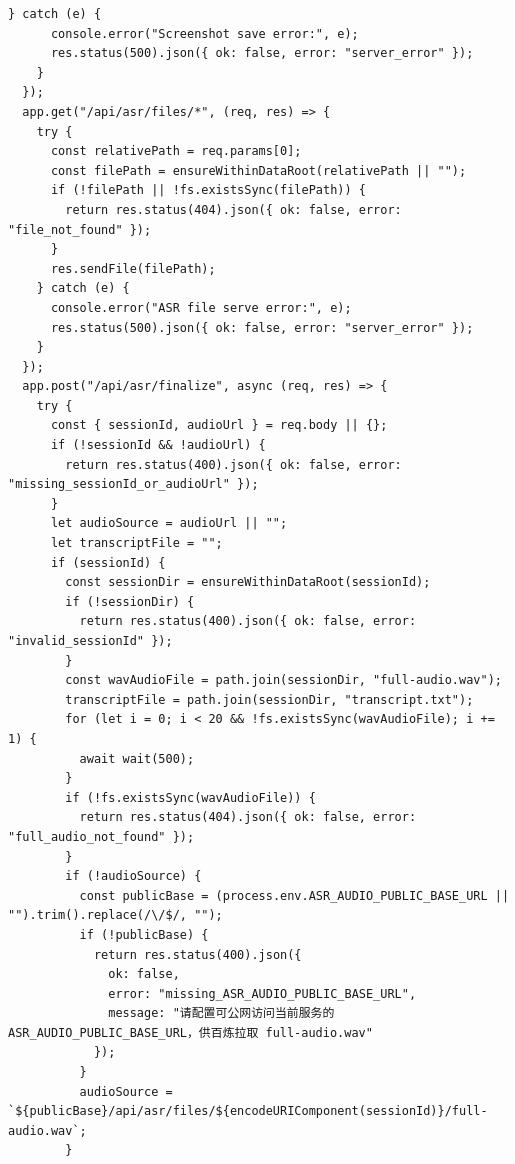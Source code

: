 \documentclass[12pt,a4paper]{article}
\begin{document}
\fancyhead[R]{}
\begin{Verbatim}[fontsize=\footnotesize]
    } catch (e) {
      console.error("Screenshot save error:", e);
      res.status(500).json({ ok: false, error: "server_error" });
    }
  });
  app.get("/api/asr/files/*", (req, res) => {
    try {
      const relativePath = req.params[0];
      const filePath = ensureWithinDataRoot(relativePath || "");
      if (!filePath || !fs.existsSync(filePath)) {
        return res.status(404).json({ ok: false, error: "file_not_found" });
      }
      res.sendFile(filePath);
    } catch (e) {
      console.error("ASR file serve error:", e);
      res.status(500).json({ ok: false, error: "server_error" });
    }
  });
  app.post("/api/asr/finalize", async (req, res) => {
    try {
      const { sessionId, audioUrl } = req.body || {};
      if (!sessionId && !audioUrl) {
        return res.status(400).json({ ok: false, error: "missing_sessionId_or_audioUrl" });
      }
      let audioSource = audioUrl || "";
      let transcriptFile = "";
      if (sessionId) {
        const sessionDir = ensureWithinDataRoot(sessionId);
        if (!sessionDir) {
          return res.status(400).json({ ok: false, error: "invalid_sessionId" });
        }
        const wavAudioFile = path.join(sessionDir, "full-audio.wav");
        transcriptFile = path.join(sessionDir, "transcript.txt");
        for (let i = 0; i < 20 && !fs.existsSync(wavAudioFile); i += 1) {
          await wait(500);
        }
        if (!fs.existsSync(wavAudioFile)) {
          return res.status(404).json({ ok: false, error: "full_audio_not_found" });
        }
        if (!audioSource) {
          const publicBase = (process.env.ASR_AUDIO_PUBLIC_BASE_URL || "").trim().replace(/\/$/, "");
          if (!publicBase) {
            return res.status(400).json({
              ok: false,
              error: "missing_ASR_AUDIO_PUBLIC_BASE_URL",
              message: "请配置可公网访问当前服务的 ASR_AUDIO_PUBLIC_BASE_URL，供百炼拉取 full-audio.wav"
            });
          }
          audioSource = `${publicBase}/api/asr/files/${encodeURIComponent(sessionId)}/full-audio.wav`;
        }
\end{Verbatim}
\newpage
{}
\fancyhead[R]{}
\end{document}
